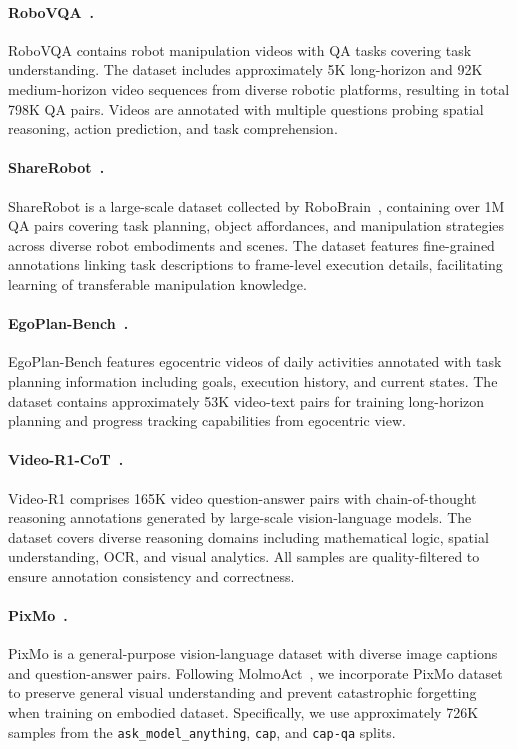 \paragraph{RoboVQA~\cite{sermanet2024robovqa}.} RoboVQA contains robot manipulation videos with QA tasks covering task understanding. The dataset includes approximately 5K long-horizon and 92K medium-horizon video sequences from diverse robotic platforms, resulting in total 798K QA pairs. Videos are annotated with multiple questions probing spatial reasoning, action prediction, and task comprehension.

\paragraph{ShareRobot~\cite{ji2025robobrain}.} ShareRobot is a large-scale dataset collected by RoboBrain~\cite{ji2025robobrain}, containing over 1M QA pairs covering task planning, object affordances, and manipulation strategies across diverse robot embodiments and scenes. The dataset features fine-grained annotations linking task descriptions to frame-level execution details, facilitating learning of transferable manipulation knowledge.

\paragraph{EgoPlan-Bench~\cite{chen2023egoplan}.} EgoPlan-Bench features egocentric videos of daily activities annotated with task planning information including goals, execution history, and current states. The dataset contains approximately 53K video-text pairs for training long-horizon planning and progress tracking capabilities from egocentric view.

\paragraph{Video-R1-CoT~\cite{feng2025video}.} Video-R1 comprises 165K video question-answer pairs with chain-of-thought reasoning annotations generated by large-scale vision-language models. The dataset covers diverse reasoning domains including mathematical logic, spatial understanding, OCR, and visual analytics. All samples are quality-filtered to ensure annotation consistency and correctness.

\paragraph{PixMo~\cite{deitke2024molmo}.} PixMo is a general-purpose vision-language dataset with diverse image captions and question-answer pairs. Following MolmoAct~\cite{lee2025molmoact}, we incorporate PixMo dataset to preserve general visual understanding and prevent catastrophic forgetting when training on embodied dataset. Specifically, we use approximately 726K samples from the \texttt{ask\_model\_anything}, \texttt{cap}, and \texttt{cap-qa} splits.

